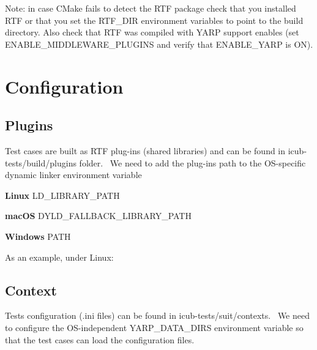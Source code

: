 Note\+: in case C\+Make fails to detect the R\+TF package check that you installed R\+TF or that you set the R\+T\+F\+\_\+\+D\+IR environment variables to point to the build directory. Also check that R\+TF was compiled with Y\+A\+RP support enables (set {\ttfamily E\+N\+A\+B\+L\+E\+\_\+\+M\+I\+D\+D\+L\+E\+W\+A\+R\+E\+\_\+\+P\+L\+U\+G\+I\+NS} and verify that {\ttfamily E\+N\+A\+B\+L\+E\+\_\+\+Y\+A\+RP} is ON).\hypertarget{installation_configuration}{}\section{Configuration}\label{installation_configuration}
\hypertarget{installation_plugins}{}\subsection{Plugins}\label{installation_plugins}
Test cases are built as R\+TF plug-\/ins (shared libraries) and can be found in {\ttfamily icub-\/tests/build/plugins} folder.~\newline
We need to add the plug-\/ins path to the O\+S-\/specific dynamic linker environment variable

\begin{DoxyItemize}
\item {\bfseries Linux} {\ttfamily L\+D\+\_\+\+L\+I\+B\+R\+A\+R\+Y\+\_\+\+P\+A\+TH} \item {\bfseries mac\+OS} {\ttfamily D\+Y\+L\+D\+\_\+\+F\+A\+L\+L\+B\+A\+C\+K\+\_\+\+L\+I\+B\+R\+A\+R\+Y\+\_\+\+P\+A\+TH} \item {\bfseries Windows} {\ttfamily P\+A\+TH}\end{DoxyItemize}
As an example, under Linux\+: 
\hypertarget{installation_context}{}\subsection{Context}\label{installation_context}
Tests configuration (.ini files) can be found in {\ttfamily icub-\/tests/suit/contexts}.~\newline
We need to configure the O\+S-\/independent {\ttfamily Y\+A\+R\+P\+\_\+\+D\+A\+T\+A\+\_\+\+D\+I\+RS} environment variable so that the test cases can load the configuration files.


 